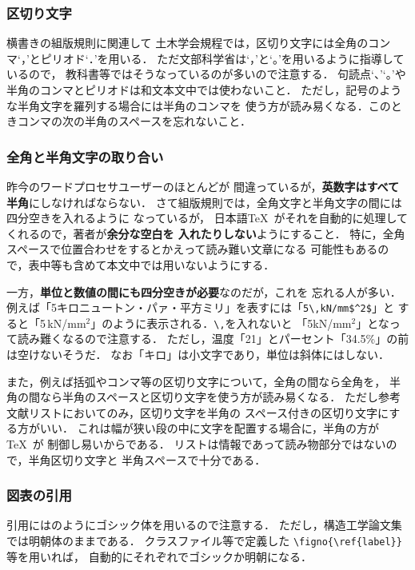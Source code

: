 \documentclass[dvipdfmx,onecolumn]{jsce}  %
\begin{document}
\subsubsection{区切り文字}

横書きの組版規則に関連して
土木学会規程では，区切り文字には全角のコンマ`，'とピリオド`．'を用いる．
ただ文部科学省は`，'と`。'を用いるように指導しているので，
教科書等ではそうなっているのが多いので注意する．
句読点`、'`。'や半角のコンマとピリオドは和文本文中では使わないこと．
ただし，記号のような半角文字を羅列する場合には半角のコンマを
使う方が読み易くなる．このときコンマの次の半角のスペースを忘れないこと．

\subsubsection{全角と半角文字の取り合い}

昨今のワードプロセサユーザーのほとんどが
間違っているが，{\bf 英数字はすべて半角}にしなければならない．
さて組版規則では，全角文字と半角文字の間には四分空きを入れるように
なっているが，
日本語\TeX\ がそれを自動的に処理してくれるので，著者が{\bf 余分な空白を
入れたりしない}ようにすること．
特に，全角スペースで位置合わせをするとかえって読み難い文章になる
可能性もあるので，表中等も含めて本文中では用いないようにする．

一方，{\bf 単位と数値の間にも四分空きが必要}なのだが，これを
忘れる人が多い．
例えば「5キロニュートン・パァ・平方ミリ」を表すには「\verb+5\,kN/mm$^2$+」と
すると「5\,kN/mm$^2$」のように表示される．\verb+\,+を入れないと
「5kN/mm$^2$」となって読み難くなるので注意する．
ただし，温度「21\degC」とパーセント「34.5\%」の前は空けないそうだ．
なお「キロ」は小文字であり，単位は斜体にはしない．

また，例えば括弧やコンマ等の区切り文字について，全角の間なら全角を，
半角の間なら半角のスペースと区切り文字を使う方が読み易くなる．
ただし参考文献リストにおいてのみ，区切り文字を半角の
スペース付きの区切り文字にする方がいい．
これは幅が狭い段の中に文字を配置する場合に，半角の方が\TeX\ が
制御し易いからである．
リストは情報であって読み物部分ではないので，半角区切り文字と
半角スペースで十分である．

\subsubsection{図表の引用}

引用には\figno{\ref{fig:layout}}のようにゴシック体を用いるので注意する．
ただし，構造工学論文集では明朝体のままである．
クラスファイル等で定義した \verb+\figno{\ref{label}}+等を用いれば，
自動的にそれぞれでゴシックか明朝になる．
\end{document}
